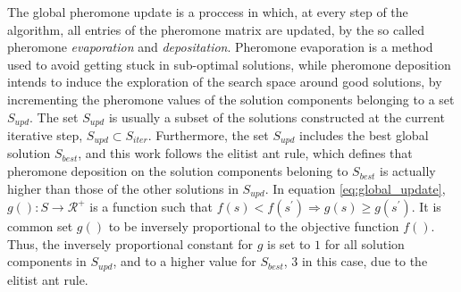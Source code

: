 The global pheromone update is a proccess in which, at every step of the
algorithm, all entries of the pheromone matrix are updated, by the so called
pheromone \textit{evaporation} and \textit{depositation}. Pheromone evaporation
is a method used to avoid getting stuck in sub-optimal solutions, while
pheromone deposition intends to induce the exploration of the search space
around good solutions, by incrementing the pheromone values of the solution
components belonging to a set $S_{upd}$. The set $S_{upd}$ is usually a subset
of the solutions constructed at the current iterative step, $S_{upd} \subset
S_{iter}$. Furthermore, the set $S_{upd}$ includes the best global solution
$S_{best}$, and this work follows the elitist ant rule, which defines that
pheromone deposition on the solution components beloning to $S_{best}$ is
actually higher than those of the other solutions in $S_{upd}$. In equation
\ref{eq:global_update}, $g(): S \rightarrow \mathcal{R}^+$ is a function such
that $f(s) < f(s^{'}) \Rightarrow g(s) \geq g(s^{'})$. It is common set $g()$ to
be inversely proportional to the objective function $f()$. Thus, the inversely
proportional constant for $g$ is set to $1$ for all solution components in
$S_{upd}$, and to a higher value for $S_{best}$, 3 in this case, due to the
elitist ant rule.







